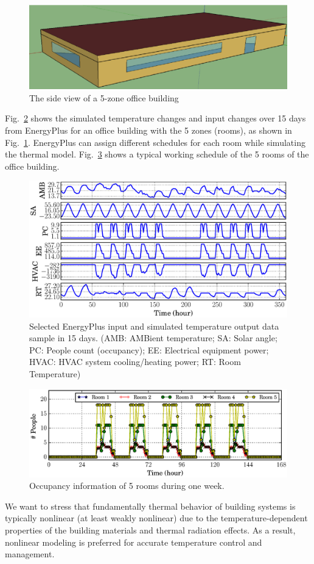 \begin{figure}[t]
    \centering
    \includegraphics[width=0.7\columnwidth]{figs/energyplus_review/5zone-a}
    \caption{The side view of a 5-zone office building}
    \label{fig:5zone}
\end{figure}

Fig.~\ref{fig:energyplus-io-curve} shows the simulated temperature changes and
input changes over 15 days from EnergyPlus for an office building with the 5 zones
(rooms), as shown in Fig.~\ref{fig:5zone}. EnergyPlus can assign different schedules
for each room while simulating the thermal model.
Fig.~\ref{fig:occupancy-curve} shows a typical working schedule of the 5 rooms
of the office building.

\begin{figure}[t]
    \includegraphics[width=0.9\columnwidth]{figs/energyplus_review/energyplus}
    \caption{Selected EnergyPlus input and simulated temperature output data sample in
        15 days.  (AMB: AMBient temperature; SA: Solar angle; PC: People count
        (occupancy); EE: Electrical equipment power; HVAC: HVAC system
        cooling/heating power; RT: Room Temperature)}
    \label{fig:energyplus-io-curve}
\end{figure}
\begin{figure}[t]
\centering
\includegraphics[width=0.9\columnwidth]{figs/energyplus_review/occupancy}
\caption{Occupancy information of 5 rooms during one week.}
\label{fig:occupancy-curve}
\end{figure}

We want to stress that fundamentally thermal behavior of building
systems is typically nonlinear (at least weakly nonlinear) due to the
temperature-dependent properties of the building materials and thermal
radiation effects. As a result, nonlinear modeling is preferred for accurate temperature
control and management.
